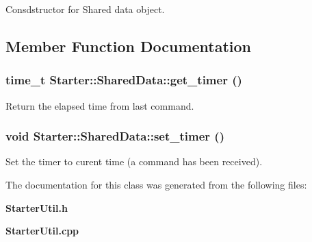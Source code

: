 Consdstructor for Shared data object.



\subsection{Member Function Documentation}
\subsubsection{\setlength{\rightskip}{0pt plus 5cm}time\_\-t Starter::Shared\-Data::get\_\-timer ()}\label{classStarter_1_1SharedData_a1}


Return the elapsed time from last command.

\subsubsection{\setlength{\rightskip}{0pt plus 5cm}void Starter::Shared\-Data::set\_\-timer ()}\label{classStarter_1_1SharedData_a2}


Set the timer to curent time (a command has been received).



The documentation for this class was generated from the following files:\begin{CompactItemize}
\item 
{\bf Starter\-Util.h}\item 
{\bf Starter\-Util.cpp}\end{CompactItemize}
